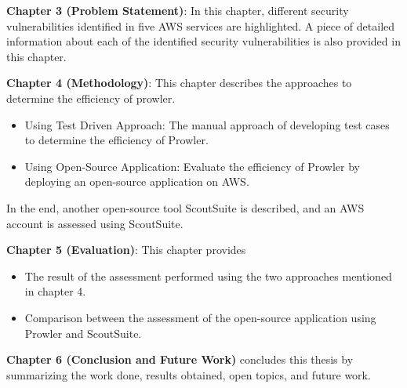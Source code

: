 \par \textbf{Chapter 3 (Problem Statement)}: In this chapter, different security vulnerabilities identified in five
AWS services are highlighted.
A piece of detailed information about each of the identified security vulnerabilities is also provided in this chapter.
\par \textbf{Chapter 4 (Methodology)}: This chapter describes the approaches to determine the efficiency of prowler.
\begin{itemize}
    \item Using Test Driven Approach: The manual approach of developing test cases to determine the efficiency of Prowler.
\end{itemize}
\begin{itemize}
    \item Using Open-Source Application: Evaluate the efficiency of Prowler by deploying an open-source
    application on AWS.
\end{itemize}
\par In the end, another open-source tool ScoutSuite is
described, and an AWS account is assessed using ScoutSuite.

\par \textbf{Chapter 5 (Evaluation)}: This chapter provides
\begin{itemize}
    \item The result of the assessment performed using the two approaches mentioned in chapter 4.
\end{itemize}
\begin{itemize}
    \item Comparison between the assessment of the open-source application using Prowler and ScoutSuite.
\end{itemize}
\par \textbf{Chapter 6 (Conclusion and Future Work)} concludes this thesis by summarizing the work done, results obtained, open topics, and future work.

